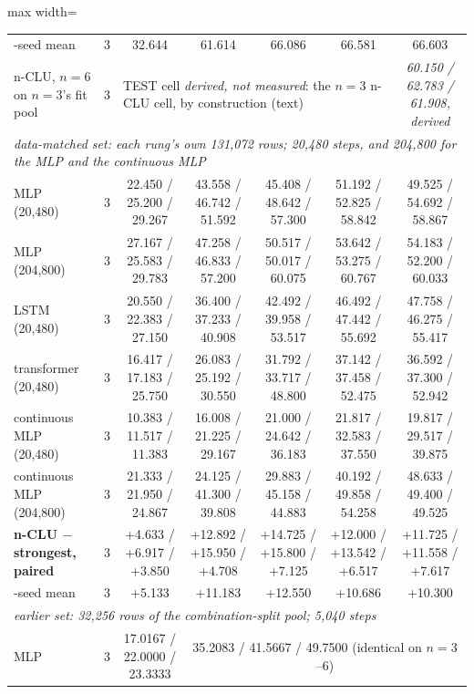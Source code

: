 \documentclass{article} %
\begin{document}
\begin{table}[t]
\begin{adjustbox}{max width=\linewidth}
\begin{tabular}{lcccccc}
\quad 3-seed mean & 3 & 32.644 & 61.614 & 66.086 & 66.581 & 66.603 \\
n-CLU, $n=6$ on $n=3$'s fit pool & 3 & \multicolumn{4}{l}{TEST cell \emph{derived, not measured}: the $n=3$ n-CLU cell, by construction (text)} & \emph{60.150 / 62.783 / 61.908, derived} \\ %
\midrule
\multicolumn{7}{l}{\emph{data-matched set: each rung's own 131,072 rows; 20,480 steps, and 204,800 for the MLP and the continuous MLP}} \\ %
MLP (20,480) & 3 & 22.450 / 25.200 / 29.267 & 43.558 / 46.742 / 51.592 & 45.408 / 48.642 / 57.300 & 51.192 / 52.825 / 58.842 & 49.525 / 54.692 / 58.867 \\
MLP (204,800) & 3 & 27.167 / 25.583 / 29.783 & 47.258 / 46.833 / 57.200 & 50.517 / 50.017 / 60.075 & 53.642 / 53.275 / 60.767 & 54.183 / 52.200 / 60.033 \\
LSTM (20,480) & 3 & 20.550 / 22.383 / 27.150 & 36.400 / 37.233 / 40.908 & 42.492 / 39.958 / 53.517 & 46.492 / 47.442 / 55.692 & 47.758 / 46.275 / 55.417 \\
transformer (20,480) & 3 & 16.417 / 17.183 / 25.750 & 26.083 / 25.192 / 30.550 & 31.792 / 33.717 / 48.800 & 37.142 / 37.458 / 52.475 & 36.592 / 37.300 / 52.942 \\
continuous MLP (20,480) & 3 & 10.383 / 11.517 / 11.383 & 16.008 / 21.225 / 29.167 & 21.000 / 24.642 / 36.183 & 21.817 / 32.583 / 37.550 & 19.817 / 29.517 / 39.875 \\
continuous MLP (204,800) & 3 & 21.333 / 21.950 / 24.867 & 24.125 / 41.300 / 39.808 & 29.883 / 45.158 / 44.883 & 40.192 / 49.858 / 54.258 & 48.633 / 49.400 / 49.525 \\
\textbf{n-CLU $-$ strongest, paired} & 3 & +4.633 / +6.917 / +3.850 & +12.892 / +15.950 / +4.708 & +14.725 / +15.800 / +7.125 & +12.000 / +13.542 / +6.517 & +11.725 / +11.558 / +7.617 \\
\quad 3-seed mean & 3 & +5.133 & +11.183 & +12.550 & +10.686 & +10.300 \\
\midrule
\multicolumn{7}{l}{\emph{earlier set: 32,256 rows of the combination-split pool; 5,040 steps}} \\ %
MLP & 3 & 17.0167 / 22.0000 / 23.3333 & \multicolumn{4}{c}{35.2083 / 41.5667 / 49.7500 (identical on $n=3$--$6$)} \\

\end{tabular}
\end{adjustbox}
\end{table}
\end{document}
